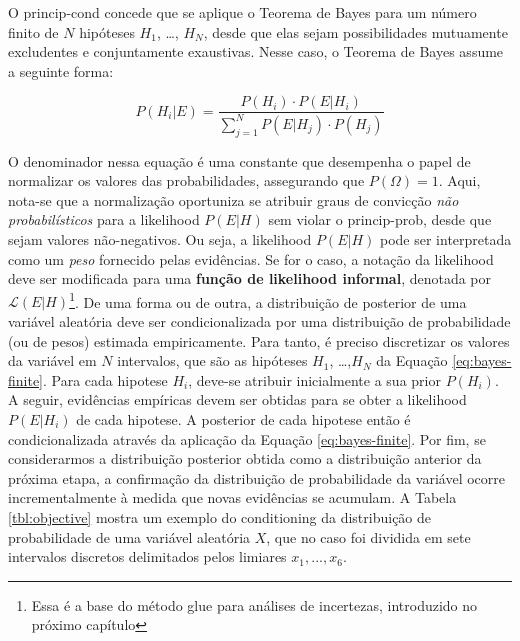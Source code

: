 \documentclass[./main.tex]{subfiles}
\begin{document}
\par O \gls{princip-cond} concede que se aplique o Teorema de Bayes para um número finito de $N$ hipóteses $H_1$, …, $H_N$, desde que elas sejam possibilidades mutuamente excludentes e conjuntamente exaustivas. Nesse caso, o Teorema de Bayes assume a seguinte forma:
\begin{linenomath*}
\begin{equation}
\label{eq:bayes-finite}
    P(H_i | E) = \frac{P(H_i) \cdot P(E | H_i)}{\sum_{j=1}^{N}P(E | H_j) \cdot P(H_j)}
\end{equation}
\end{linenomath*}
O denominador nessa equação é uma constante que desempenha o papel de normalizar os valores das probabilidades,  assegurando que $P(\Omega) = 1$. Aqui, nota-se que a normalização oportuniza se atribuir graus de convicção \textit{não probabilísticos} para a \gls{likelihood} $P(E | H)$ sem violar o \gls{princip-prob}, desde que sejam valores não-negativos. Ou seja, a \gls{likelihood} $P(E | H)$ pode ser interpretada como um \textit{peso} fornecido pelas evidências. Se for o caso, a notação da \gls{likelihood} deve ser modificada para uma \textbf{função de \gls{likelihood} informal}, denotada por $\mathcal{L}(E|H)$\footnote{Essa é a base do método \acrfull{glue} para análises de incertezas, introduzido no próximo capítulo}. De uma forma ou de outra, a distribuição de \gls{posterior} de uma variável aleatória deve ser condicionalizada por uma distribuição de probabilidade (ou de pesos) estimada empiricamente. Para tanto, é preciso discretizar os valores da variável em $N$ intervalos, que são as hipóteses $H_1$, …,$H_N$ da Equação \eqref{eq:bayes-finite}. Para cada \gls{hipotese} $H_i$, deve-se atribuir inicialmente a sua \gls{prior} $P(H_i)$. A seguir, evidências empíricas devem ser obtidas para se obter a \gls{likelihood} $P(E | H_i)$ de cada \gls{hipotese}. A \gls{posterior} de cada \gls{hipotese} então é condicionalizada através da aplicação da Equação \eqref{eq:bayes-finite}. Por fim, se considerarmos a distribuição posterior obtida como a distribuição anterior da próxima etapa, a confirmação da distribuição de probabilidade da variável ocorre incrementalmente à medida que novas evidências se acumulam. A Tabela \ref{tbl:objective} mostra um exemplo do \gls{conditioning} da distribuição de probabilidade de uma variável aleatória $X$, que no caso foi dividida em sete intervalos discretos delimitados pelos limiares $x_1, ..., x_6$.
\end{document}
